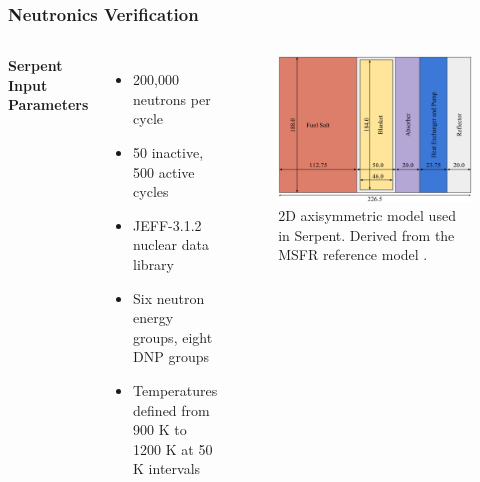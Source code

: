 \begin{frame}
	\frametitle{Neutronics Verification}
		\begin{columns}
			\column{5cm}
				\textbf{Serpent Input Parameters}
					\begin{itemize}
						\item 200,000 neutrons per cycle
						\item 50 inactive, 500 active cycles
						\item JEFF-3.1.2 nuclear data library
						\item Six neutron energy groups, eight \gls{DNP} groups
						\item Temperatures defined from 900 K to 1200 K at 50 K
						intervals
					\end{itemize}
			\column{5cm}
				\begin{figure}
					\centering
					\includegraphics[width=\textwidth]
					{../paper/figures/reference}
					\caption{2D axisymmetric model used in Serpent. Derived from
					the \gls{MSFR} reference model
					\cite{fiorina_modelling_2014}.}
					\label{fig:reference}
				\end{figure}
		\end{columns}
\end{frame}

